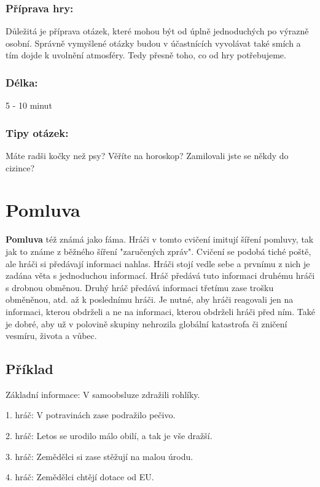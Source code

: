 \subsubsection{Příprava hry:} Důležitá je příprava otázek, které mohou být od úplně jednoduchých po výrazně osobní. Správně vymyšlené otázky budou v účastnících vyvolávat také smích a tím dojde k uvolnění atmosféry. Tedy přesně toho, co od hry potřebujeme. 
 
\subsubsection{Délka:} 5 - 10 minut 
 
\subsubsection{Tipy otázek:} Máte radši kočky než psy? 
Věříte na horoskop? 
Zamilovali jste se někdy do cizince? 
 
 
 
 
\needspace{5cm} \section{Pomluva} \label{pomluva} \textbf{Pomluva}{} též známá jako fáma. Hráči v tomto cvičení imitují šíření pomluvy, tak jak to známe z běžného šíření "zaručených zpráv". Cvičení se podobá tiché poště, ale hráči si předávají informaci nahlas. Hráči stojí vedle sebe a prvnímu z nich je zadána věta s jednoduchou informací. Hráč předává tuto informaci druhému hráči s drobnou obměnou. Druhý hráč předává informaci třetímu zase trošku obměněnou, atd. až k poslednímu hráči. Je nutné, aby hráči reagovali jen na informaci, kterou obdrželi a ne na informaci, kterou obdrželi hráči před ním. Také je dobré, aby už v polovině skupiny nehrozila globální katastrofa či zničení vesmíru, života a vůbec. 
 
 
\subsection{Příklad}  
Základní informace: V samoobsluze zdražili rohlíky. 
 
1. hráč: V potravinách zase podražilo pečivo. 
 
2. hráč: Letos se urodilo málo obilí, a tak je vše dražší. 
 
3. hráč: Zemědělci si zase stěžují na malou úrodu. 
 
4. hráč: Zemědělci chtějí dotace od EU. 
 
